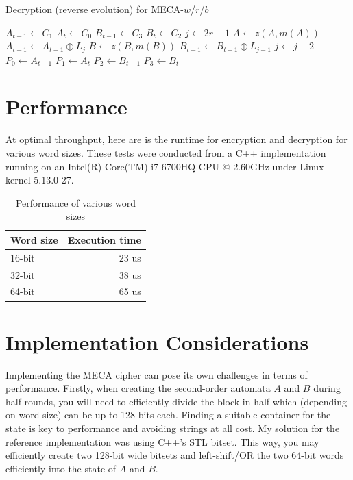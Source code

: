 \documentclass{article}
\begin{document}
\begin{algorithm}[H]
  \begin{algorithmic}
    \caption{Decryption (reverse evolution) for MECA-$w$/$r$/$b$}\label{alg:decryption}
    \Input
    \EndInput
    \Output
    \EndOutput
    \State $A_{t-1} \gets C_1$
    \State $A_{t} \gets C_0$
	\State $B_{t-1} \gets C_3$
	\State $B_{t} \gets C_2$
	\State $j \gets 2r-1$
		\State $A \gets z(A, m(A))$
		\State $A_{t-1} \gets A_{t-1} \oplus L_j$
		\State $B \gets z(B, m(B))$
		\State $B_{t-1} \gets B_{t-1} \oplus L_{j-1}$
		\State $j \gets j - 2$
    \EndFor
    \State $P_0 \gets A_{t-1}$
    \State $P_1 \gets A_{t}$
    \State $P_2 \gets B_{t-1}$
    \State $P_3 \gets B_{t}$
  \end{algorithmic}
\end{algorithm}

\section{Performance}

At optimal throughput, here are is the runtime for encryption and decryption for various word sizes. These tests were conducted from a C++ implementation running on an Intel(R) Core(TM) i7-6700HQ CPU @ 2.60GHz under Linux kernel 5.13.0-27.

\begin{table}[h!]
  \begin{center}
    \caption{Performance of various word sizes}
    \label{tab:performance}
    \begin{tabular}{l|r}
      \textbf{Word size} & \textbf{Execution time}\\
      \hline
      16-bit & 23 us\\
      32-bit & 38 us\\
      64-bit & 65 us\\
    \end{tabular}
  \end{center}
\end{table}

\section{Implementation Considerations}

Implementing the MECA cipher can pose its own challenges in terms of performance. Firstly, when creating the second-order automata $A$ and $B$ during half-rounds, you will need to efficiently divide the block in half which (depending on word size) can be up to 128-bits each. Finding a suitable container for the state is key to performance and avoiding strings at all cost. My solution for the reference implementation was using C++'s STL bitset. This way, you may efficiently create two 128-bit wide bitsets and left-shift/OR the two 64-bit words efficiently into the state of $A$ and $B$.
\end{document}
